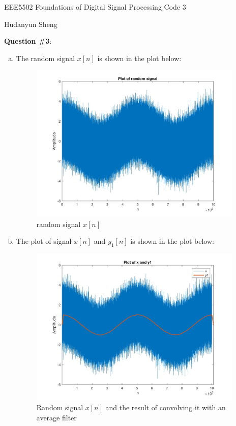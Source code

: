 \documentclass[a4paper]{article}
\begin{document}
\begin{spacing}{2.0}
\begin{flushleft}\begin{huge}EEE5502 Foundations of Digital Signal Processing   Code 3\end{huge}\end{flushleft}
\begin{flushright}\begin{Large} Hudanyun Sheng \end{Large}\end{flushright}

\Large\textbf{ Question \#3}:  \\
\normalsize
\begin{enumerate}[(a)]
\item The random signal $x[n]$ is shown in the plot below:
\begin{figure} [H]
\centering
\includegraphics[width=4in]{Q3a.jpg}
\caption{random signal $x[n]$}
\label{fig:graph}
\end{figure}

\item The plot of  signal $x[n]$ and $y_1[n]$ is shown in the plot below:
\begin{figure} [H]
\centering
\includegraphics[width=4in]{Q3b.jpg}
\caption{Random signal $x[n]$ and the result of convolving it with an average filter}
\label{fig:graph}
\end{figure}


\end{enumerate}
\end{spacing}
\end{document}
